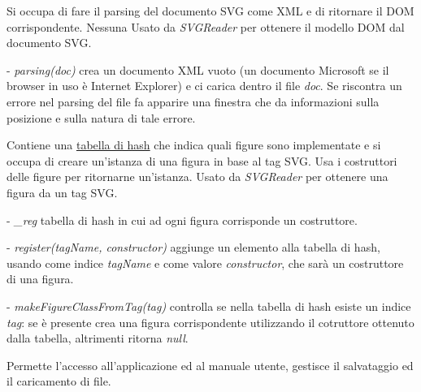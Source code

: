 Si occupa di fare il parsing del documento SVG come XML e di ritornare il DOM corrispondente.
Nessuna
Usato da \textit{SVGReader} per ottenere il modello DOM dal documento SVG.
\begin{elencopuntato}[\subsubsecindent]
\item[-] \textit{parsing(doc)} crea un documento XML vuoto (un documento Microsoft se il browser in uso \`e Internet Explorer) e ci carica dentro il file \textit{doc}. Se riscontra un errore nel parsing del file fa apparire una finestra che da informazioni sulla posizione e sulla natura di tale errore.
\end{elencopuntato}

Contiene una \underline{tabella di hash} che indica quali figure sono implementate e si occupa di creare un'istanza di una figura in base al tag SVG.
Usa i costruttori delle figure per ritornarne un'istanza.
Usato da \textit{SVGReader} per ottenere una figura da un tag SVG.
\begin{elencopuntato}[\subsubsecindent]
\item[-] \textit{{\_}reg} tabella di hash in cui ad ogni figura corrisponde un costruttore.
\end{elencopuntato}
\begin{elencopuntato}[\subsubsecindent]
\item[-] \textit{register(tagName, constructor)} aggiunge un elemento alla tabella di hash, usando come indice \textit{tagName} e come valore \textit{constructor}, che sar\`a un costruttore di una figura.
\item[-] \textit{makeFigureClassFromTag(tag)} controlla se nella tabella di hash esiste un indice \textit{tag}: se \`e presente crea una figura corrispondente utilizzando il cotruttore ottenuto dalla tabella, altrimenti ritorna \textit{null}.
\end{elencopuntato}

Permette l'accesso all'applicazione ed al manuale utente, gestisce il salvataggio ed il caricamento di file.

